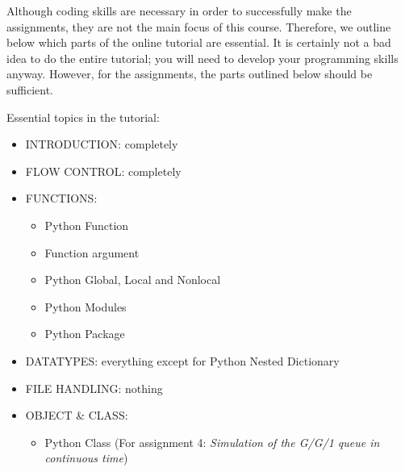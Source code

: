 Although coding skills are necessary in order to successfully make the assignments, they are not the main focus of this course. Therefore, we outline below which parts of the online tutorial are essential. It is certainly not a bad idea to do the entire tutorial; you will need to develop your programming skills anyway. However, for the assignments, the parts outlined below should be sufficient.

Essential topics in the tutorial:
\begin{itemize}
\item INTRODUCTION: completely
\item FLOW CONTROL: completely
\item FUNCTIONS: 
	\begin{itemize}
	\item Python Function
	\item Function argument
	\item Python Global, Local and Nonlocal
	\item Python Modules
	\item Python Package
	\end{itemize}
\item DATATYPES: everything except for Python Nested Dictionary
\item FILE HANDLING: nothing
\item OBJECT \& CLASS: 
\begin{itemize}
\item Python Class (For assignment 4: \emph{Simulation of the G/G/1 queue in continuous time})
\end{itemize}
\end{itemize}

